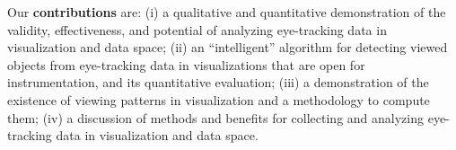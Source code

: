 Our \textbf{contributions} are: (i) a qualitative and quantitative demonstration of the validity, effectiveness, and potential of analyzing eye-tracking data in visualization and data space; (ii) an ``intelligent'' algorithm for detecting viewed objects from eye-tracking data in visualizations that are open for instrumentation, and its quantitative evaluation; (iii) a demonstration of the existence of viewing patterns in visualization and a methodology to compute them; (iv) a discussion of methods and benefits for collecting and analyzing eye-tracking data in visualization and data space.

